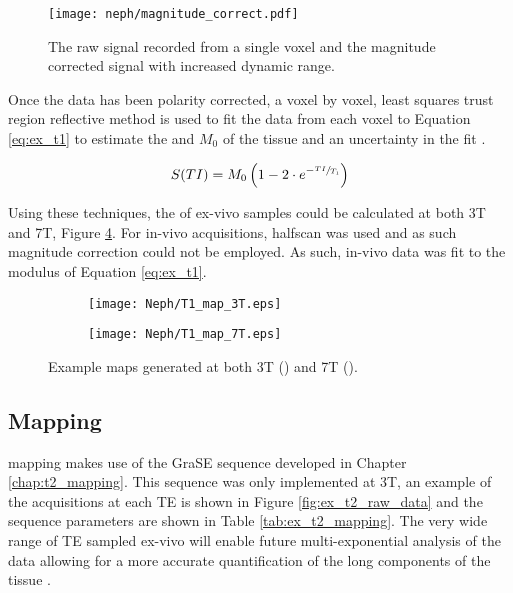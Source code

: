 \begin{figure}[H]
	\centering
	\texttt{[image: neph/magnitude\_correct.pdf]}
	\caption{The raw signal recorded from a single voxel and the magnitude corrected signal with increased dynamic range.}
	\label{fig:ex_sig_mag_correction}	
\end{figure}

Once the data has been polarity corrected, a voxel by voxel, least squares trust region reflective method is used to fit the data from each voxel to Equation \eqref{eq:ex_t1} to estimate the \tone and $M_0$ of the tissue and an uncertainty in the fit \cite{branch_subspace_1999}.

\begin{equation}
	S(TI) = M_0\left(1-2 \cdot e^{-\sfrac{TI}{T_1}}\right)
	\label{eq:ex_t1}
\end{equation}

Using these techniques, the \tone of ex-vivo samples could be calculated at both 3T and 7T, Figure \ref{fig:ex_t1_maps}. For in-vivo acquisitions, halfscan was used and as such magnitude correction could not be employed. As such, in-vivo data was fit to the modulus of Equation \eqref{eq:ex_t1}.
 
\begin{figure}[H]
	\centering
	\begin{subfigure}[c]{0.47\textwidth}
		\centering
		\texttt{[image: Neph/T1\_map\_3T.eps]}
		\caption{}
		\label{fig:ex_t1_map_3t}
	\end{subfigure}
	\hfill
	\begin{subfigure}[c]{0.47\textwidth}
		\centering
		\texttt{[image: Neph/T1\_map\_7T.eps]}
		\caption{}
		\label{fig:ex_t1_map_7t}
	\end{subfigure}
	\caption{Example \tone maps generated at both 3T () and 7T ().}
	\label{fig:ex_t1_maps}
\end{figure}

\subsection{\ttwo Mapping}

\ttwo mapping makes use of the \ac{GraSE} sequence developed in Chapter \ref{chap:t2_mapping}. This sequence was only implemented at 3T, an example of the acquisitions at each \ac{TE} is shown in Figure \ref{fig:ex_t2_raw_data} and the sequence parameters are shown in Table \ref{tab:ex_t2_mapping}. The very wide range of \ac{TE} sampled ex-vivo will enable future multi-exponential analysis of the data allowing for a more accurate quantification of the long \ttwo components of the tissue \cite{bjarnason_analyzennls_2010, sabouri_mr_2017}.

